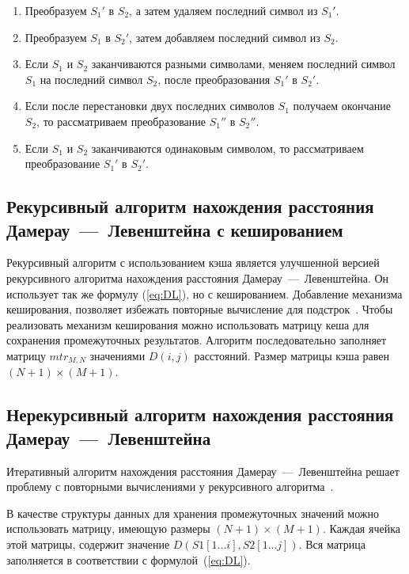 \begin{enumerate}
	\item Преобразуем $S_{1}'$ в $S_{2}$, а затем удаляем последний символ из $S_{1}'$.
	\item Преобразуем $S_{1}$ в $S_{2}'$, затем добавляем последний символ из $S_{2}$.
	\item Если $S_{1}$ и $S_{2}$ заканчиваются разными символами, меняем последний символ $S_{1}$ на последний символ $S_{2}$, после преобразования $S_{1}'$ в $S_{2}'$.
	\item Если после перестановки двух последних символов $S_{1}$ получаем окончание $S_{2}$, то рассматриваем преобразование $S_{1}''$ в $S_{2}''$.
	\item Если $S_{1}$ и $S_{2}$ заканчиваются одинаковым символом, то рассматриваем преобразование $S_{1}'$ в $S_{2}'$.
\end{enumerate}



\subsection{Рекурсивный алгоритм нахождения расстояния Дамерау~---~Левенштейна с кешированием}

Рекурсивный алгоритм с использованием кэша является улучшенной версией рекурсивного алгоритма нахождения расстояния Дамерау~---~Левенштейна.
Он использует так же формулу (\ref{eq:DL}), но с кешированием. 
Добавление механизма кеширования, позволяет избежать повторные вычисление для подстрок~\cite{analysis-lev-damlev}.
Чтобы реализовать механизм кеширования можно использовать матрицу кеша для сохранения промежуточных результатов. 
Алгоритм последовательно заполняет матрицу $mtr_{M, N}$ значениями $D(i, j)$ расстояний. Размер матрицы кэша равен $(N + 1) \times (M + 1)$.

\subsection{Нерекурсивный алгоритм нахождения расстояния Дамерау~---~Левенштейна}

Итеративный алгоритм нахождения расстояния Дамерау~---~Левенштейна решает проблему с повторными вычислениями у рекурсивного алгоритма~\cite{analysis-lev-damlev}. 
	
В качестве структуры данных для хранения промежуточных значений можно использовать матрицу, имеющую  размеры $(N + 1) \times (M + 1)$. 
Каждая ячейка этой матрицы, содержит значение $D(S1[1...i], S2[1...j])$. 
Вся матрица заполняется в соответствии с формулой~(\ref{eq:DL}). 

